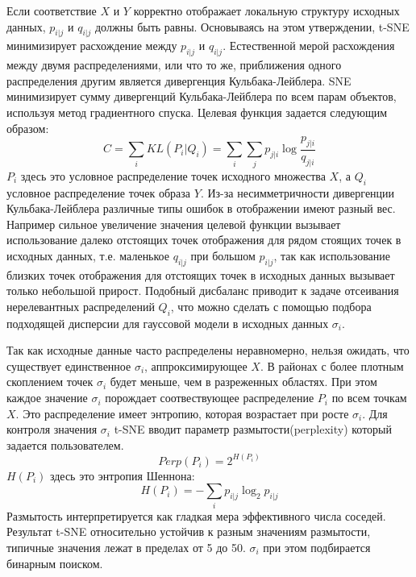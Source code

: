 Если соответствие $X$ и $Y$ корректно отображает локальную структуру исходных данных, $p_{i|j}$ и $q_{i|j}$ должны быть равны. Основываясь на этом утверждении, t-SNE минимизирует расхождение между $p_{i|j}$ и $q_{i|j}$. Естественной мерой расхождения между двумя распределениями, или что то же, приближения одного распределения другим является дивергенция Кульбака-Лейблера. SNE минимизирует сумму дивергенций Кульбака-Лейблера по всем парам объектов, используя метод градиентного спуска. Целевая функция задается следующим образом: 
\begin{equation}
	C = \sum_i KL(P_i | Q_i) = \sum_i \sum_j p_{j|i} \log{\frac{p_{j|i}}{q_{j|i}}}
\end{equation}
$P_i$ здесь это условное распределение точек исходного множества $X$, а $Q_i$ условное распределение точек образа $Y$. Из-за несимметричности дивергенции Кульбака-Лейблера различные типы ошибок в отображении имеют разный вес. Например сильное увеличение значения целевой функции вызывает использование далеко отстоящих точек отображения для рядом стоящих точек в исходных данных, т.е. маленькое $q_{i|j}$ при большом $p_{i|j}$, так как использование близких точек отображения для отстоящих точек в исходных данных вызывает только небольшой прирост. Подобный дисбаланс приводит к задаче отсеивания нерелевантных распределений $Q_i$, что можно сделать с помощью подбора подходящей дисперсии для гауссовой модели в исходных данных $\sigma_i$\cite{maaten2008visualizing}.

Так как исходные данные часто распределены неравномерно, нельзя ожидать, что существует единственное $\sigma_i$, аппроксимирующее $X$. В районах с более плотным скоплением точек $\sigma_i$ будет меньше, чем в разреженных областях. При этом каждое значение $\sigma_i$ порождает соотвествующее распределение $P_i$ по всем точкам $X$. Это распределение имеет энтропию, которая возрастает при росте $\sigma_i$. Для контроля значения $\sigma_i$ t-SNE вводит параметр размытости(perplexity) который задается пользователем. 
\begin{equation}
	Perp(P_i) = 2^{H(P_i)}
\end{equation}
$H(P_i)$ здесь это энтропия Шеннона:
\begin{equation}
	H(P_i) = - \sum_i p_{i|j} \log_2{p_{i|j}}
\end{equation}
Размытость интерпретируется как гладкая мера эффективного числа соседей. Результат t-SNE относительно устойчив к разным значениям размытости, типичные значения лежат в пределах от 5 до 50. $\sigma_i$ при этом подбирается бинарным поиском.

